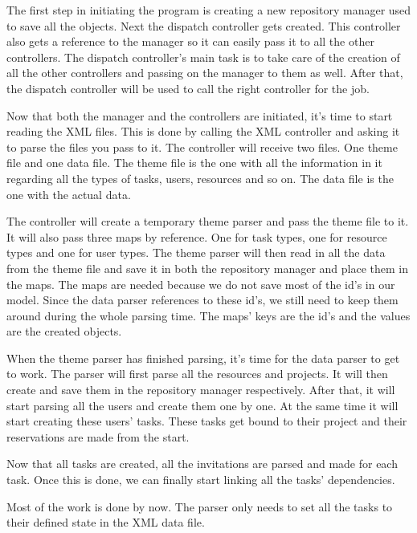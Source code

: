 			The first step in initiating the program is creating a new repository manager used to save all the objects. Next the dispatch controller gets created. This controller also gets a reference to the manager so it can easily pass it to all the other controllers. The dispatch controller's main task is to take care of the creation of all the other controllers and passing on the manager to them as well. After that, the dispatch controller will be used to call the right controller for the job.
			
			Now that both the manager and the controllers are initiated, it's time to start reading the XML files. This is done by calling the XML controller and asking it to parse the files you pass to it. The controller will receive two files. One theme file and one data file. The theme file is the one with all the information in it regarding all the types of tasks, users, resources and so on. The data file is the one with the actual data.
			
			The controller will create a temporary theme parser and pass the theme file to it. It will also pass three maps by reference. One for task types, one for resource types and one for user types. The theme parser will then read in all the data from the theme file and save it in both the repository manager and place them in the maps. The maps are needed because we do not save most of the id's in our model. Since the data parser references to these id's, we still need to keep them around during the whole parsing time. The maps' keys are the id's and the values are the created objects.
			
			When the theme parser has finished parsing, it's time for the data parser to get to work. The parser will first parse all the resources and projects. It will then create and save them in the repository manager respectively. After that, it will start parsing all the users and create them one by one. At the same time it will start creating these users' tasks. These tasks get bound to their project and their reservations are made from the start. 
			
			Now that all tasks are created, all the invitations are parsed and made for each task. Once this is done, we can finally start linking all the tasks' dependencies. 
			
			Most of the work is done by now. The parser only needs to set all the tasks to their defined state in the XML data file. 

